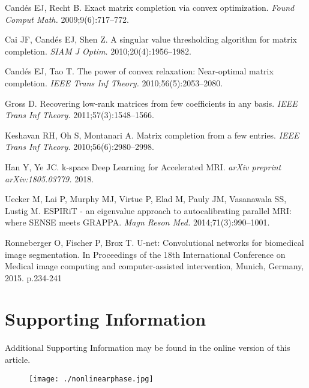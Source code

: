 \documentclass[num-refs]{wiley-article}
\newcommand{\0}{{\boldsymbol{0}}}
\newcommand{\1}{\blmath{1}}
\begin{document}
\begin{thebibliography}{10}
		Cand{\'e}s EJ, Recht B.
		\newblock Exact matrix completion via convex optimization.
		\newblock \textit{Found Comput Math.} 2009;9(6):717–772. 
		
		Cai JF, Cand{\'e}s EJ, Shen Z.
		\newblock A singular value thresholding algorithm for matrix completion.
		\newblock \textit{SIAM J Optim.} 2010;20(4):1956–1982.
		
		Cand{\'e}s EJ, Tao T. 
		\newblock The power of convex relaxation: Near-optimal matrix completion.
		\newblock \textit{IEEE Trans Inf Theory.} 2010;56(5):2053–2080.
		
		Gross D. 
		\newblock Recovering low-rank matrices from few coefficients in any basis.
		\newblock \textit{IEEE Trans Inf Theory.} 2011;57(3):1548–1566.
		
		Keshavan RH, Oh S, Montanari A.
		\newblock Matrix completion from a few entries. 
		\newblock \textit{IEEE Trans Inf Theory.} 2010;56(6):2980–2998.
		
		Han Y, Ye JC.
		\newblock k-space Deep Learning for Accelerated MRI.
		\newblock \textit{arXiv preprint arXiv:1805.03779.} 2018.
		
		Uecker M, Lai P, Murphy MJ, Virtue P, Elad M, Pauly JM, Vasanawala SS, Lustig M.
		\newblock ESPIRiT - an eigenvalue approach to autocalibrating parallel MRI: where SENSE meets GRAPPA.
		\newblock \textit{Magn Reson Med.} 2014;71(3):990–1001.
		
		Ronneberger O, Fischer P, Brox T.
		\newblock U-net: Convolutional networks for biomedical image segmentation.
		\newblock In Proceedings of the 18th International Conference on Medical image computing and computer-assisted intervention, Munich, Germany, 2015. p.234-241
		
	\end{thebibliography}
	\pagebreak
	
	\section*{Supporting Information}
	Additional Supporting Information may be found in the online version of this article.
	\begin{figure}[h]
		\centering
		\texttt{[image: ./nonlinearphase.jpg]}

	\end{figure}
\end{document}
